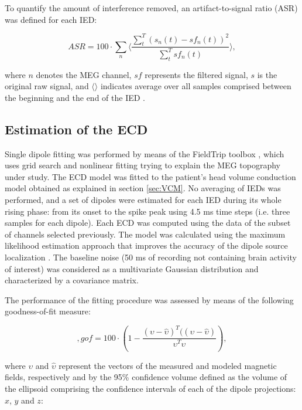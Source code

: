 To quantify the amount of interference removed, an artifact-to-signal ratio (ASR) was defined for each IED:

\begin{equation} \label{eq:2-1}
ASR = 100 \cdot \sum_{n} \langle \frac{\sum_{t}^{T} (s_{n}(t)-sf_{n}(t))^2}{\sum_{t}^T sf_{n}(t)} \rangle ,
\end{equation}

where $n$ denotes the MEG channel, $sf$ represents the filtered signal, $s$ is the original raw signal, and $ \langle \rangle $ indicates average over all samples comprised between the beginning and the end of the IED \citep{Nowak2009}.

\subsection{Estimation of the ECD}

Single dipole fitting was performed by means of the FieldTrip toolbox \citep{Oostenveld2011}, which uses grid search and nonlinear fitting trying to explain the MEG topography under study. The ECD model was fitted to the patient's head volume conduction model obtained as explained in section \ref{sec:VCM}. No averaging of IEDs was performed, and a set of dipoles were estimated for each IED during its whole rising phase: from its onset to the spike peak using 4.5 ms time steps (i.e. three samples for each dipole). Each ECD was computed using the data of the subset of channels selected previously. The model was calculated using the maximum likelihood estimation approach that improves the accuracy of the dipole source localization \citep{Lutkenhoner1998}. The baseline noise (50 ms of recording not containing brain activity of interest) was considered as a multivariate Gaussian distribution and characterized by a covariance matrix.

The performance of the fitting procedure was assessed by means of the following goodness-of-fit measure:

\begin{equation} \label{eq:2-2},
gof = 100 \cdot ( 1 - \frac{(\upsilon - \hat{\upsilon})^T ((\upsilon - \hat{\upsilon})}{\upsilon ^{T} \upsilon}),
\end{equation}

where $\upsilon$ and $\hat{\upsilon}$ represent the vectors of the measured and modeled magnetic fields, respectively and by the 95\% confidence volume defined as the volume of the ellipsoid comprising the confidence intervals of each of the dipole projections: $x$, $y$ and $z$:

